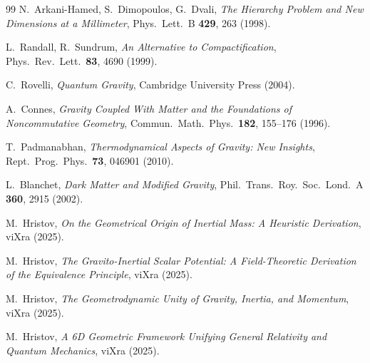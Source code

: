 \documentclass[12pt]{article}
\begin{document}
\begin{thebibliography}{99}
N.~Arkani-Hamed, S.~Dimopoulos, G.~Dvali,
\textit{The Hierarchy Problem and New Dimensions at a Millimeter},
Phys.\ Lett.\ B \textbf{429}, 263 (1998).

L.~Randall, R.~Sundrum,
\textit{An Alternative to Compactification},
Phys.\ Rev.\ Lett.\ \textbf{83}, 4690 (1999).

C.~Rovelli,
\textit{Quantum Gravity},
Cambridge University Press (2004).

A.~Connes,
\textit{Gravity Coupled With Matter and the Foundations of Noncommutative Geometry},
Commun.\ Math.\ Phys.\ \textbf{182}, 155–176 (1996).

T.~Padmanabhan,
\textit{Thermodynamical Aspects of Gravity: New Insights},
Rept.\ Prog.\ Phys.\ \textbf{73}, 046901 (2010).

L.~Blanchet,
\textit{Dark Matter and Modified Gravity},
Phil.\ Trans.\ Roy.\ Soc.\ Lond.\ A \textbf{360}, 2915 (2002).

M.~Hristov,
\textit{On the Geometrical Origin of Inertial Mass: A Heuristic Derivation},
viXra (2025).

M.~Hristov,
\textit{The Gravito-Inertial Scalar Potential: A Field-Theoretic Derivation of the Equivalence Principle},
viXra (2025).

M.~Hristov,
\textit{The Geometrodynamic Unity of Gravity, Inertia, and Momentum},
viXra (2025).

M.~Hristov,
\textit{A 6D Geometric Framework Unifying General Relativity and Quantum Mechanics},
viXra (2025).

\end{thebibliography}
\end{document}
